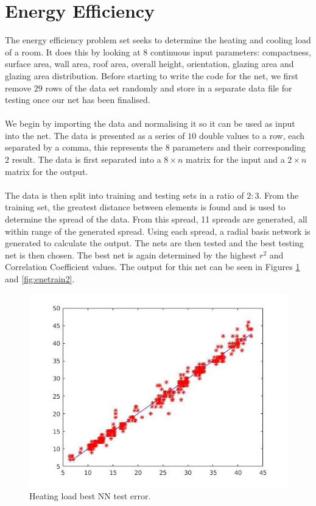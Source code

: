 \documentclass{article}%
\begin{document}
\section{Energy Efficiency}
The energy efficiency problem set seeks to determine the heating and cooling load of a room. It does this by looking at 8 continuous input parameters: compactness, surface area, wall area, roof area, overall height, orientation, glazing area and glazing area distribution. Before starting to write the code for the net, we first remove $29$ rows of the data set randomly and store in a separate data file for testing once our net has been finalised.
\\
\\
We begin by importing the data and normalising it so it can be used as input into the net. The data is presented as a series of $10$ double values to a row, each separated by a comma, this represents the $8$ parameters and their corresponding $2$ result. The data is first separated into a $8 \times n$ matrix for the input and a $2 \times n$ matrix for the output.
\\
\\
The data is then split into training and testing sets in a ratio of $2:3$.  From the training set, the greatest distance between elements is found and is used to determine the spread of the data. From this spread, 11 spreads are generated, all within range of the generated spread. Using each spread, a radial basis network is generated to calculate the output. The nets are then tested and the best testing net is then chosen. The best net is again determined by the highest $r^2$ and Correlation Coefficient values. The output for this net can be seen in Figures  \ref{fig:enetrain1} and \ref{fig:enetrain2}.
\begin{figure}[H]
\centering
\includegraphics[scale=0.5]{Images/enetrain1.jpg}
\caption{Heating load best NN test error.}
\label{fig:enetrain1}
\end{figure}
\end{document}
